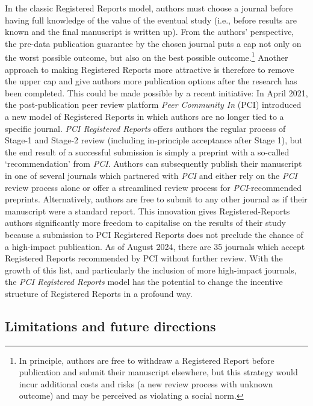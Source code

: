 \documentclass[
  ,man,mask,floatsintext]{apa6}
\begin{document}
In the classic Registered Reports model, authors must choose a journal before having full knowledge of the value of the eventual study (i.e., before results are known and the final manuscript is written up).
From the authors' perspective, the pre-data publication guarantee by the chosen journal puts a cap not only on the worst possible outcome, but also on the best possible outcome.\footnote{In principle, authors are free to withdraw a Registered Report before publication and submit their manuscript elsewhere, but this strategy would incur additional costs and risks (a new review process with unknown outcome) and may be perceived as violating a social norm.}
Another approach to making Registered Reports more attractive is therefore to remove the upper cap and give authors more publication options after the research has been completed.
This could be made possible by a recent initiative:
In April 2021, the post-publication peer review platform \emph{Peer Community In} (PCI) introduced a new model of Registered Reports in which authors are no longer tied to a specific journal.
\emph{PCI Registered Reports} offers authors the regular process of Stage-1 and Stage-2 review (including in-principle acceptance after Stage 1), but the end result of a successful submission is simply a preprint with a so-called `recommendation' from \emph{PCI}.
Authors can subsequently publish their manuscript in one of several journals which partnered with \emph{PCI} and either rely on the \emph{PCI} review process alone or offer a streamlined review process for \emph{PCI}-recommended preprints.
Alternatively, authors are free to submit to any other journal as if their manuscript were a standard report.
This innovation gives Registered-Reports authors significantly more freedom to capitalise on the results of their study because a submission to PCI Registered Reports does not preclude the chance of a high-impact publication.
As of August 2024, there are 35 journals which accept Registered Reports recommended by PCI without further review.
With the growth of this list, and particularly the inclusion of more high-impact journals, the \emph{PCI Registered Reports} model has the potential to change the incentive structure of Registered Reports in a profound way.

\hypertarget{limitations-and-future-directions}{%
\subsection{Limitations and future directions}\label{limitations-and-future-directions}}
\end{document}

